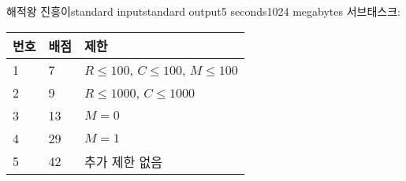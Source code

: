 \begin{problem}{해적왕 진흥이}{standard input}{standard output}{5 seconds}{1024 megabytes}
서브태스크:

\begin{tabular}{|l|l|l|} \hline
  \textbf{번호} & \textbf{배점} & \textbf{제한} \\ \hline
  1 & 7 & $R \le 100$, $C \le 100$, $M \le 100$ \\ \hline
  2 & 9 & $R \le 1000$, $C \le 1000$ \\ \hline
  3 & 13 & $M=0$ \\ \hline
  4 & 29 & $M=1$ \\ \hline
  5 & 42 & 추가 제한 없음 \\ \hline
\end{tabular}

\Examples

\begin{example}
%
%
%
\end{example}

\end{problem}

